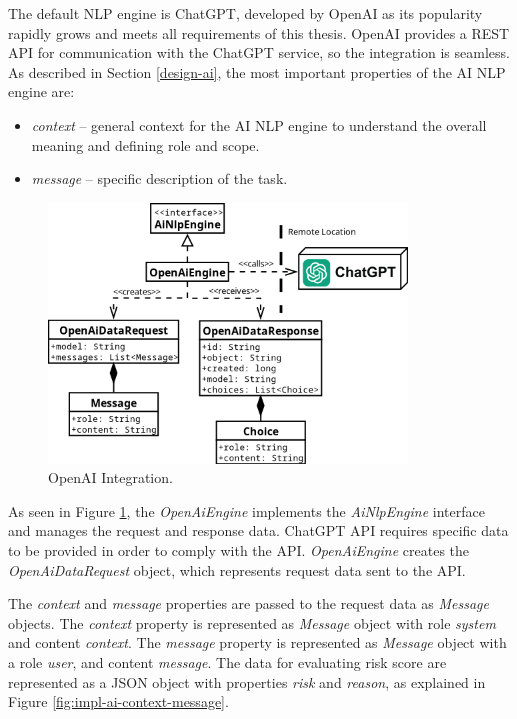 The default NLP engine is ChatGPT, developed by OpenAI as its popularity rapidly grows and meets all requirements of this thesis.
OpenAI provides a REST API for communication with the ChatGPT service, so the integration is seamless.
\newline
\newline
As described in Section \ref{design-ai}, the most important properties of the AI NLP engine are:

\begin{itemize}
    \item \textit{context} -- general context for the AI NLP engine to understand the overall meaning and defining role and scope.
    \item \textit{message} -- specific description of the task.  
\end{itemize}

\begin{figure}[htbp]
  \centering
  \includegraphics[width=0.85\textwidth]{img/sections/6-implementation/ai-engine-openai.png}
  \caption{OpenAI Integration.}
  \label{fig:impl-ai-openai-integration}
\end{figure}

\newpage

As seen in Figure \ref{fig:impl-ai-openai-integration}, the \textit{OpenAiEngine} implements the \textit{AiNlpEngine} interface and manages the request and response data.
ChatGPT API requires specific data to be provided in order to comply with the API.
\textit{OpenAiEngine} creates the \textit{OpenAiDataRequest} object, which represents request data sent to the API.

The \textit{context} and \textit{message} properties are passed to the request data as \textit{Message} objects.
The \textit{context} property is represented as \textit{Message} object with role \textit{system} and content \textit{context}.
The \textit{message} property is represented as \textit{Message} object with a role \textit{user}, and content \textit{message}.
The data for evaluating risk score are represented as a JSON object with properties \textit{risk} and \textit{reason}, as explained in Figure \ref{fig:impl-ai-context-message}.

